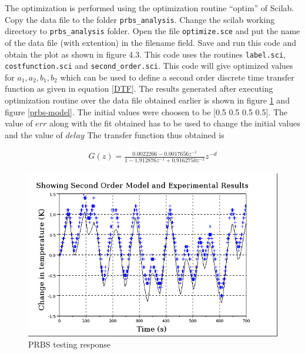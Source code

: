 The optimization is performed using the optimization routine “optim” of Scilab. Copy the  data file to the folder {\tt prbs\_analysis}. Change the scilab working directory to {\tt prbs\_analysis} folder. Open the file {\tt optimize.sce} and put the name of the data file (with extention) in the filename field. Save and run this code and obtain the plot as shown in figure 4.3. This code uses the routines {\tt label.sci}, {\tt costfunction.sci} and {\tt second\_order.sci}. This code will give optimized values for $a_1, a_2, b_1, b_2$ which can be used to define a second order discrete time transfer function as given in equation \ref{DTF}. The results generated after executing optimization routine over the data file obtained earlier is shown in figure \ref{prbs-fit} and figure \ref{prbs-model}. The initial values were choosen to be [0.5 0.5 0.5 0.5]. The value of $err$ along with the fit obtained has to be used to change the initial values and the value of $delay$ The transfer function thus obtained is 

\begin{align}\label{model}
G(z)=\frac{0.0022266 - 0.0017656 z^{-1}}{1-1.912876z^{-1}+0.9162750z^{-2}}z^{-d}
\end{align}\label{model}



\begin{figure}
\centering
\includegraphics[width=0.7\linewidth]{prbs/prbs-fit.png}
\caption{PRBS testing response}
\label{prbs-fit}
\end{figure}

